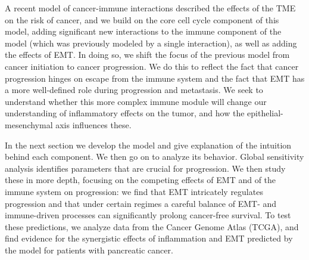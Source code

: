 \documentclass[11pt]{article}
\begin{document}
A recent model of cancer-immune interactions \cite{guo17_multiscale} described the effects of the TME on the risk of cancer, and we build on the core cell cycle component of this model, adding significant new interactions to the immune component of the model (which was previously modeled by a single interaction), as well as adding the effects of EMT.
In doing so, we shift the focus of the previous model from cancer initiation to cancer progression.
We do this to reflect the fact that cancer progression hinges on escape from the immune system and the fact that EMT has a more well-defined role during progression and metastasis.
We seek to understand whether this more complex immune module will change our understanding of inflammatory effects on the tumor, and how the epithelial-mesenchymal axis influences these.
\par 
In the next section we develop the model and give explanation of the intuition behind each component.
We then go on to analyze its behavior.
Global sensitivity analysis identifies parameters that are crucial for progression.
We then study these in more depth, focusing on the competing effects of EMT and of the immune system on progression: we find that EMT intricately regulates progression and that under certain regimes a careful balance of EMT- and immune-driven processes can significantly prolong cancer-free survival.
To test these predictions, we analyze data from the Cancer Genome Atlas (TCGA), and find evidence for the synergistic effects of inflammation and EMT predicted by the model for patients with pancreatic cancer.

\end{document}

